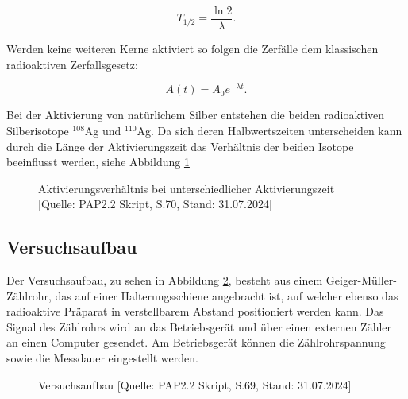 \documentclass{article}
\begin{document}
\begin{equation}
    T_{1/2} = \frac{\ln 2}{\lambda}.
    \label{eq:HWT}
\end{equation} 

Werden keine weiteren Kerne aktiviert so folgen die Zerfälle dem klassischen radioaktiven Zerfallsgesetz:

\begin{equation}
    A(t) = A_0 e^{- \lambda t}.
\end{equation}

Bei der Aktivierung von natürlichem Silber entstehen die beiden radioaktiven Silberisotope $^{108}$Ag und $^{110}$Ag. Da sich deren Halbwertszeiten unterscheiden kann durch die Länge der Aktivierungszeit das Verhältnis der beiden Isotope beeinflusst werden, siehe Abbildung \ref{fig:Verhältnis}

\begin{figure}[!h]
    \centering
    \caption{Aktivierungsverhältnis bei unterschiedlicher Aktivierungszeit [Quelle: PAP2.2 Skript, S.70, Stand: 31.07.2024]}
    \label{fig:Verhältnis}
\end{figure}


\subsection{Versuchsaufbau}

Der Versuchsaufbau, zu sehen in Abbildung \ref{fig:aufbau}, besteht aus einem Geiger-Müller-Zählrohr, das auf einer Halterungsschiene angebracht ist, auf welcher ebenso das radioaktive Präparat in verstellbarem Abstand positioniert werden kann. Das Signal des Zählrohrs wird an das Betriebsgerät und über einen externen Zähler an einen Computer gesendet. Am Betriebsgerät können die Zählrohrspannung sowie die Messdauer eingestellt werden.

\begin{figure}[!b]
    \centering
    \caption{Versuchsaufbau [Quelle: PAP2.2 Skript, S.69, Stand: 31.07.2024]}
    \label{fig:aufbau}
\end{figure}
\end{document}
